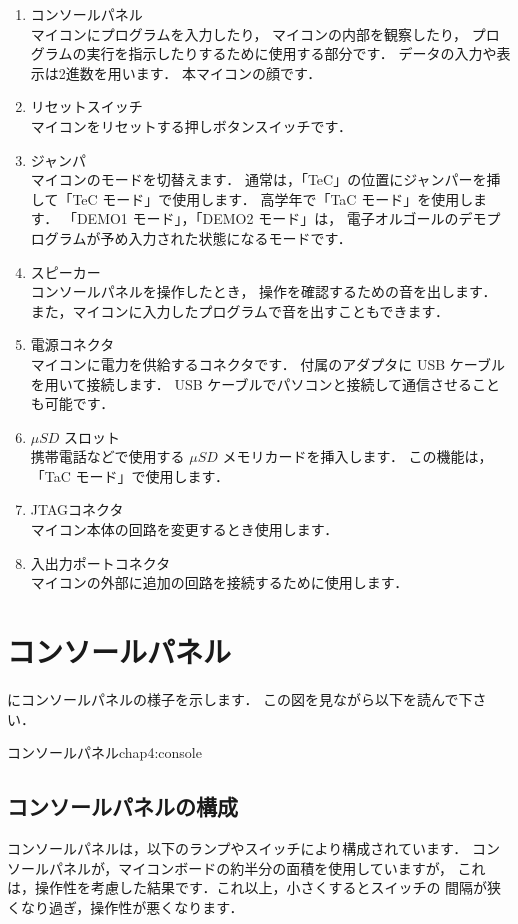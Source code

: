 \begin{enumerate}
\item コンソールパネル \\
  マイコンにプログラムを入力したり，
  マイコンの内部を観察したり，
  プログラムの実行を指示したりするために使用する部分です．
  データの入力や表示は2進数を用います．
  本マイコンの顔です．
\item リセットスイッチ \\
  マイコンをリセットする押しボタンスイッチです．
\item ジャンパ \\
  マイコンのモードを切替えます．
  通常は，「TeC」の位置にジャンパーを挿して「TeC モード」で使用します．
  高学年で「TaC モード」を使用します．
  「DEMO1 モード」，「DEMO2 モード」は，
  電子オルゴールのデモプログラムが予め入力された状態になるモードです．
\item スピーカー \\
  コンソールパネルを操作したとき，
  操作を確認するための音を出します．
  また，マイコンに入力したプログラムで音を出すこともできます．
\item 電源コネクタ \\
  マイコンに電力を供給するコネクタです．
  付属のアダプタに USB ケーブルを用いて接続します．
  USB ケーブルでパソコンと接続して通信させることも可能です．
\item $\mu SD$ スロット \\
  携帯電話などで使用する $\mu SD$ メモリカードを挿入します．
  この機能は，「TaC モード」で使用します．
\item JTAGコネクタ \\
  マイコン本体の回路を変更するとき使用します．
\item 入出力ポートコネクタ \\
  マイコンの外部に追加の回路を接続するために使用します．
\end{enumerate}

\section{コンソールパネル}
にコンソールパネルの様子を示します．
この図を見ながら以下を読んで下さい．

           {コンソールパネル}{chap4:console}

\subsection{コンソールパネルの構成}
コンソールパネルは，以下のランプやスイッチにより構成されています．
コンソールパネルが，マイコンボードの約半分の面積を使用していますが，
これは，操作性を考慮した結果です．これ以上，小さくするとスイッチの
間隔が狭くなり過ぎ，操作性が悪くなります．

